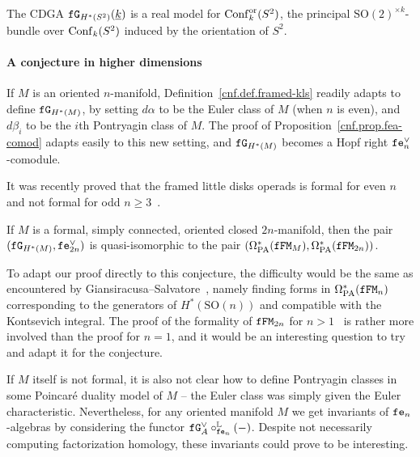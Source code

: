 \begin{corollary}
  The CDGA $\ff\GG{H^{*}(S^2)}(\underline{k})$ is a real model for $\Conf^{\mathrm{or}}_{k}(S^2)$, the principal $\mathrm{SO}(2)^{\times k}$-bundle over $\Conf_{k}(S^2)$ induced by the orientation of $S^2$.
\end{corollary}

\paragraph{A conjecture in higher dimensions}

If $M$ is an oriented $n$-manifold, Definition~\ref{cnf.def.framed-kls} readily adapts to define $\ff\GG{H^{*}(M)}$, by setting $d\alpha$ to be the Euler class of $M$ (when $n$ is even), and $d\beta_{i}$ to be the $i$th Pontryagin class of $M$.
The proof of Proposition~\ref{cnf.prop.fea-comod} adapts easily to this new setting, and $\ff\GG{H^{*}(M)}$ becomes a Hopf right $\ff\enV$-comodule.

It was recently proved that the framed little disks operads is formal for even $n$ and not formal for odd $n \ge 3$~\cite{Moriya2016,KhoroshkinWillwacher2017}.

\begin{conjecture}
  If $M$ is a formal, simply connected, oriented closed $2n$-manifold, then the pair $(\ff\GG{H^{*}(M)}, \ff\enV[2n])$ is quasi-isomorphic to the pair $(\OmPA^{*}(\ff\FM_{M}), \OmPA^{*}(\ff\FM_{2n}))$.
\end{conjecture}

To adapt our proof directly to this conjecture, the difficulty would be the same as encountered by Giansiracusa--Salvatore~\cite{GiansiracusaSalvatore2010}, namely finding forms in $\OmPA^{*}(\ff\FM_{n})$ corresponding to the generators of $H^{*}(\mathrm{SO}(n))$ and compatible with the Kontsevich integral.
The proof of the formality of $\ff\FM_{2n}$ for $n > 1$~\cite{KhoroshkinWillwacher2017} is rather more involved than the proof for $n = 1$, and it would be an interesting question to try and adapt it for the conjecture.

If $M$ itself is not formal, it is also not clear how to define Pontryagin classes in some Poincaré duality model of $M$ -- the Euler class was simply given the Euler characteristic.
Nevertheless, for any oriented manifold $M$ we get invariants of $\ff\en$-algebras by considering the functor $\ff\GG{A}^{\vee} \circ^{\mathbb{L}}_{\ff\en} (-)$.
Despite not necessarily computing factorization homology, these invariants could prove to be interesting.
